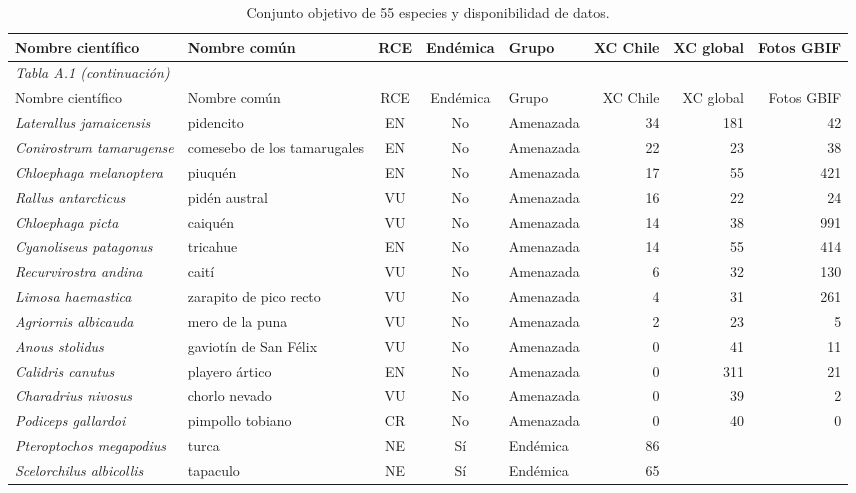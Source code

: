{\scriptsize
\begin{longtable}{@{}l l c c l r r r@{}}
  \caption{Conjunto objetivo de 55 especies y disponibilidad de datos.}
  \label{tab:anexo-especies}\\
  \toprule
  Nombre científico & Nombre común & RCE & Endémica & Grupo & XC Chile & XC global & Fotos GBIF \\
  \midrule
  \endfirsthead
  \multicolumn{8}{l}{\footnotesize\textit{Tabla A.1 (continuación)}}\\
  \toprule
  Nombre científico & Nombre común & RCE & Endémica & Grupo & XC Chile & XC global & Fotos GBIF \\
  \midrule
  \endhead
  \bottomrule
  \endlastfoot
    \textit{Laterallus jamaicensis} & pidencito & EN & No & Amenazada & 34 & 181 & 42 \\
    \textit{Conirostrum tamarugense} & comesebo de los tamarugales & EN & No & Amenazada & 22 & 23 & 38 \\
    \textit{Chloephaga melanoptera} & piuquén & EN & No & Amenazada & 17 & 55 & 421 \\
    \textit{Rallus antarcticus} & pidén austral & VU & No & Amenazada & 16 & 22 & 24 \\
    \textit{Chloephaga picta} & caiquén & VU & No & Amenazada & 14 & 38 & 991 \\
    \textit{Cyanoliseus patagonus} & tricahue & EN & No & Amenazada & 14 & 55 & 414 \\
    \textit{Recurvirostra andina} & caití & VU & No & Amenazada & 6 & 32 & 130 \\
    \textit{Limosa haemastica} & zarapito de pico recto & VU & No & Amenazada & 4 & 31 & 261 \\
    \textit{Agriornis albicauda} & mero de la puna & VU & No & Amenazada & 2 & 23 & 5 \\
    \textit{Anous stolidus} & gaviotín de San Félix & VU & No & Amenazada & 0 & 41 & 11 \\
    \textit{Calidris canutus} & playero ártico & EN & No & Amenazada & 0 & 311 & 21 \\
    \textit{Charadrius nivosus} & chorlo nevado & VU & No & Amenazada & 0 & 39 & 2 \\
    \textit{Podiceps gallardoi} & pimpollo tobiano & CR & No & Amenazada & 0 & 40 & 0 \\
    \textit{Pteroptochos megapodius} & turca & NE & Sí & Endémica & 86 &  &  \\
    \textit{Scelorchilus albicollis} & tapaculo & NE & Sí & Endémica & 65 &  &  \\

\end{longtable}}
